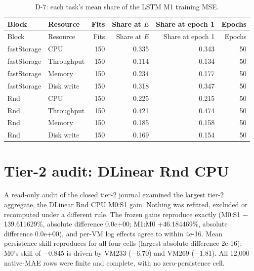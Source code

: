 \small
\setlength{\tabcolsep}{3pt}
\begin{longtable}{@{}llrrrr@{}}
\caption{D-7: each task's mean share of the LSTM M1 training MSE.}\label{tab:supp-t2-d7}\\
\toprule
Block & Resource & Fits & Share at $E$ & Share at epoch 1 & Epochs \\
\midrule
\endfirsthead
\toprule
Block & Resource & Fits & Share at $E$ & Share at epoch 1 & Epochs \\
\midrule
\endhead
\bottomrule
\endfoot
fastStorage & CPU & 150 & 0.335 & 0.343 & 50 \\
fastStorage & Throughput & 150 & 0.114 & 0.134 & 50 \\
fastStorage & Memory & 150 & 0.234 & 0.177 & 50 \\
fastStorage & Disk write & 150 & 0.318 & 0.347 & 50 \\
Rnd & CPU & 150 & 0.225 & 0.215 & 50 \\
Rnd & Throughput & 150 & 0.421 & 0.474 & 50 \\
Rnd & Memory & 150 & 0.185 & 0.158 & 50 \\
Rnd & Disk write & 150 & 0.169 & 0.154 & 50 \\
\end{longtable}
\normalsize\setlength{\tabcolsep}{4pt}
\clearpage
\section*{Tier-2 audit: DLinear Rnd CPU}
A read-only audit of the closed tier-2 journal examined the largest tier-2 aggregate{,} the DLinear Rnd CPU M0:S1 gain. Nothing was refitted{,} excluded or recomputed under a different rule. The frozen gains reproduce exactly (M0:S1 $-$139.611629\%{,} absolute difference 0.0e+00; M1:M0 +46.184469\%{,} absolute difference 0.0e+00){,} and per-VM log effects agree to within 4e-16. Mean persistence skill reproduces for all four cells (largest absolute difference 2e-16); M0's skill of $-$0.845 is driven by VM233 ($-$6.70) and VM269 ($-$1.81). All 12{,}000 native-MAE rows were finite and complete{,} with no zero-persistence cell.

